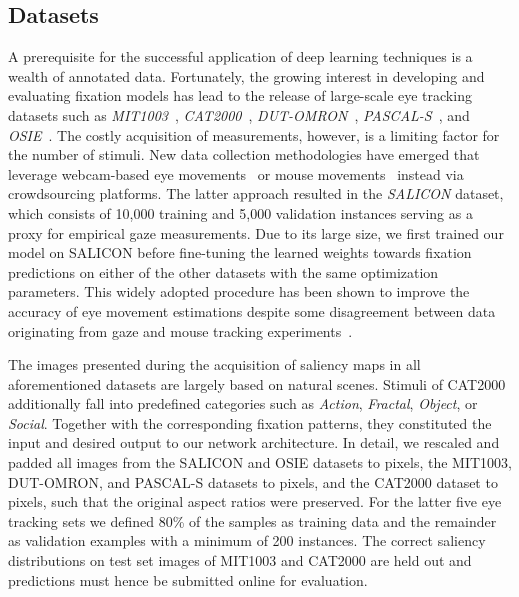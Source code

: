 \documentclass[final,1p,times,number]{elsarticle}
\begin{document}
\subsection{Datasets}

A prerequisite for the successful application of deep learning techniques is a wealth of annotated data. Fortunately, the growing interest in developing and evaluating fixation models has lead to the release of large-scale eye tracking datasets such as \textit{MIT1003}~\cite{judd2009learning}, \textit{CAT2000}~\cite{borji2015cat2000}, \textit{DUT-OMRON}~\cite{yang2013saliency}, \textit{PASCAL-S}~\cite{li2014secrets}, and \textit{OSIE}~\cite{xu2014predicting}. The costly acquisition of measurements, however, is a limiting factor for the number of stimuli. New data collection methodologies have emerged that leverage webcam-based eye movements~\cite{xu2015turkergaze} or mouse movements~\cite{jiang2015salicon} instead via crowdsourcing platforms. The latter approach resulted in the \textit{SALICON} dataset, which consists of 10,000 training and 5,000 validation instances serving as a proxy for empirical gaze measurements. Due to its large size, we first trained our model on SALICON before fine-tuning the learned weights towards fixation predictions on either of the other datasets with the same optimization parameters. This widely adopted procedure has been shown to improve the accuracy of eye movement estimations despite some disagreement between data originating from gaze and mouse tracking experiments~\cite{tavakoli2017saliency}.

The images presented during the acquisition of saliency maps in all aforementioned datasets are largely based on natural scenes. Stimuli of CAT2000 additionally fall into predefined categories such as \textit{Action}, \textit{Fractal}, \textit{Object}, or \textit{Social}. Together with the corresponding fixation patterns, they constituted the input and desired output to our network architecture. In detail, we rescaled and padded all images from the SALICON and OSIE datasets to  pixels, the MIT1003, DUT-OMRON, and PASCAL-S datasets to  pixels, and the CAT2000 dataset to  pixels, such that the original aspect ratios were preserved. For the latter five eye tracking sets we defined 80\% of the samples as training data and the remainder as validation examples with a minimum of 200 instances. The correct saliency distributions on test set images of MIT1003 and CAT2000 are held out and predictions must hence be submitted online for evaluation.
\end{document}
